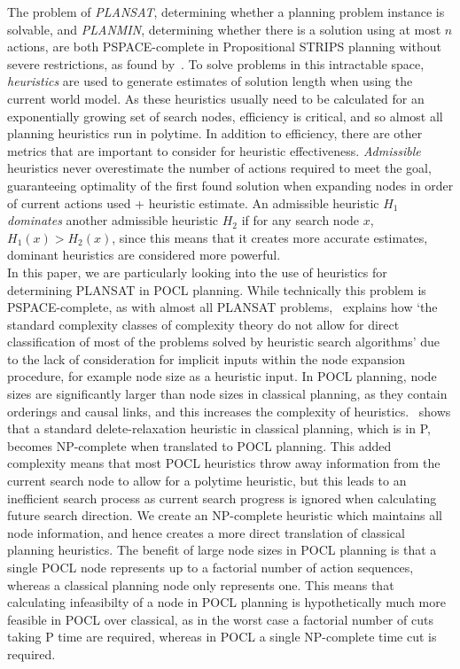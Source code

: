 The problem of \textit{PLANSAT}, determining whether a planning problem instance is solvable, and \textit{PLANMIN}, determining whether there is a solution using at most $n$ actions, are both PSPACE-complete in Propositional STRIPS planning without severe restrictions, as found by~\cite{The Computational Complexity of Propositional STRIPS Planning}. To solve problems in this intractable space, \textit{heuristics} are used to generate estimates of solution length when using the current world model. As these heuristics usually need to be calculated for an exponentially growing set of search nodes, efficiency is critical, and so almost all planning heuristics run in polytime. In addition to efficiency, there are other metrics that are important to consider for heuristic effectiveness. \textit{Admissible} heuristics never overestimate the number of actions required to meet the goal, guaranteeing optimality of the first found solution when expanding nodes in order of current actions used + heuristic estimate. An admissible heuristic $H_1$ \textit{dominates} another admissible heuristic $H_2$ if for any search node $x$, $H_1(x)>H_2(x)$, since this means that it creates more accurate estimates, dominant heuristics are considered more powerful.\\


In this paper, we are particularly looking into the use of heuristics for determining PLANSAT in POCL planning. While technically this problem is PSPACE-complete, as with almost all PLANSAT problems,~\cite{The complexity of searching implicit graphs} explains how `the standard complexity classes of complexity theory do not allow for direct classification of most of the problems solved by heuristic search algorithms' due to the lack of consideration for implicit inputs within the node expansion procedure, for example node size as a heuristic input. In POCL planning, node sizes are significantly larger than node sizes in classical planning, as they contain orderings and causal links, and this increases the complexity of heuristics.~\cite{A Closer Look at Causal Links: Complexity Results for Delete-Relaxation in Partial Order Causal Link (POCL) Planning} shows that a standard delete-relaxation heuristic in classical planning, which is in P, becomes NP-complete when translated to POCL planning. This added complexity means that most POCL heuristics throw away information from the current search node to allow for a polytime heuristic, but this leads to an inefficient search process as current search progress is ignored when calculating future search direction. We create an NP-complete heuristic which maintains all node information, and hence creates a more direct translation of classical planning heuristics. The benefit of large node sizes in POCL planning is that a single POCL node represents up to a factorial number of action sequences, whereas a classical planning node only represents one. This means that calculating infeasibilty of a node in POCL planning is hypothetically much more feasible in POCL over classical, as in the worst case a factorial number of cuts taking P time are required, whereas in POCL a single NP-complete time cut is required.


